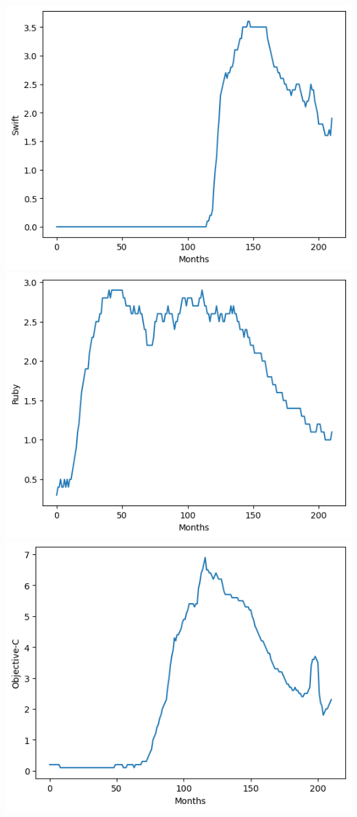 \documentclass[conference]{IEEEtran}
\begin{document}
\includegraphics[scale=0.4]{lineplot/swift.png}
\includegraphics[scale=0.4]{lineplot/ruby.png}
\includegraphics[scale=0.4]{lineplot/objective-c.png}
\end{document}
